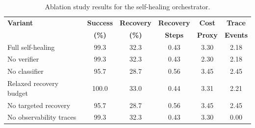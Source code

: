 \begin{table}[H]
\centering
\caption{Ablation study results for the self-healing orchestrator.}
\label{tab:ablation_results}
\footnotesize
\setlength{\tabcolsep}{4.5pt}
\begin{tabularx}{\textwidth}{L{0.30\textwidth} c c c c c}
\toprule
\textbf{Variant} 
& \textbf{Success} 
& \textbf{Recovery} 
& \textbf{Recovery} 
& \textbf{Cost} 
& \textbf{Trace} \\
& \textbf{(\%)} 
& \textbf{(\%)} 
& \textbf{Steps} 
& \textbf{Proxy} 
& \textbf{Events} \\
\midrule
Full self-healing & 99.3 & 32.3 & 0.43 & 3.30 & 2.18 \\
No verifier & 99.3 & 32.3 & 0.43 & 2.30 & 2.18 \\
No classifier & 95.7 & 28.7 & 0.56 & 3.45 & 2.45 \\
Relaxed recovery budget & 100.0 & 33.0 & 0.44 & 3.31 & 2.21 \\
No targeted recovery & 95.7 & 28.7 & 0.56 & 3.45 & 2.45 \\
No observability traces & 99.3 & 32.3 & 0.43 & 3.30 & 0.00 \\
\bottomrule
\end{tabularx}
\end{table}

